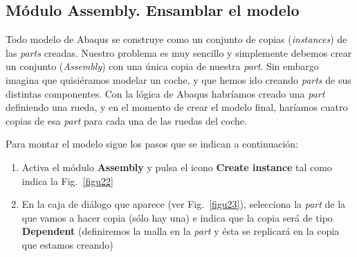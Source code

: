 \subsection{Módulo Assembly. Ensamblar el modelo}

Todo modelo de Abaqus se construye como un conjunto de copias
(\textit{instances}) de las \textit{parts} creadas. Nuestro problema
es muy sencillo y simplemente debemos crear un conjunto
(\textit{Assembly}) con una única copia de nuestra \textit{part}.  Sin
embargo imagina que quisiéramos modelar un coche, y que hemos ido
creando \textit{parts} de sus distintas componentes. Con la lógica de
Abaqus habríamos creado una \textit{part} definiendo una rueda, y en el
momento de crear el modelo final, haríamos cuatro copias de esa
\textit{part} para cada una de las ruedas del coche.

Para montar el modelo sigue los pasos que se indican a continuación:
\begin{enumerate}
\item Activa el módulo \textbf{Assembly} y pulsa el icono
  \textbf{Create instance} tal como indica la Fig.~\ref{figu22}
\item En la caja de diálogo que aparece (ver Fig.~\ref{figu23}),
  selecciona la \textit{part} de la que vamos a hacer copia (sólo hay
  una) e indica que la copia será de tipo \textbf{Dependent}
  (definiremos la malla en la \textit{part} y ésta se replicará en la
  copia que estamos creando)
\end{enumerate}


